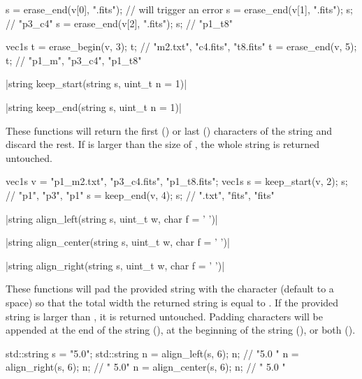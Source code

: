 {\begin{example}
\begin{cppcode}
s = erase_end(v[0], ".fits");
// will trigger an error
s = erase_end(v[1], ".fits");
s; // "p3_c4"
s = erase_end(v[2], ".fits");
s; // "p1_t8"

vec1s t = erase_begin(v, 3);
t; // {"m2.txt", "c4.fits", "t8.fits"}
t = erase_end(v, 5);
t; // {"p1_m", "p3_c4", "p1_t8"}
\end{cppcode}
\end{example}

\item \vectorfunc \cppinline|string keep_start(string s, uint_t n = 1)| 

\vectorfunc \cppinline|string keep_end(string s, uint_t n = 1)| 

These functions will return the first () or last ()  characters of the string  and discard the rest. If  is larger than the size of , the whole string is returned untouched.

\begin{example}
\begin{cppcode}
vec1s v = {"p1_m2.txt", "p3_c4.fits", "p1_t8.fits"};
vec1s s = keep_start(v, 2);
s; // {"p1", "p3", "p1"}
s = keep_end(v, 4);
s; // {".txt", "fits", "fits"}
\end{cppcode}
\end{example}

\item \vectorfunc \cppinline|string align_left(string s, uint_t w, char f = ' ')| 

\vectorfunc \cppinline|string align_center(string s, uint_t w, char f = ' ')| 

\vectorfunc \cppinline|string align_right(string s, uint_t w, char f = ' ')| 

These functions will pad the provided string with the character  (default to a space) so that the total width the returned string is equal to . If the provided string is larger than , it is returned untouched. Padding characters will be appended at the end of the string (), at the beginning of the string (), or both ().

\begin{example}
\begin{cppcode}
std::string s = "5.0";
std::string n = align_left(s, 6);
n; // "5.0   "
n = align_right(s, 6);
n; // "   5.0"
n = align_center(s, 6);
n; // " 5.0  "


\end{cppcode}
\end{example}}
